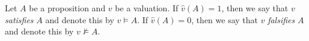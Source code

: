 

\setcounter{section}{1}
\setcounter{subsection}{3}
\setcounter{dfn}{4}

\begin{dfn}
Let $A$ be a proposition and $v$ be a valuation.
If $\hat{v}(A) = 1$, then we say that $v$ \emph{satisfies} $A$ and denote this by $v \vDash A$.
If $\hat{v}(A) = 0$, then we say that $v$ \emph{falsifies} $A$ and denote this by $v \nvDash A$.
\end{dfn}

